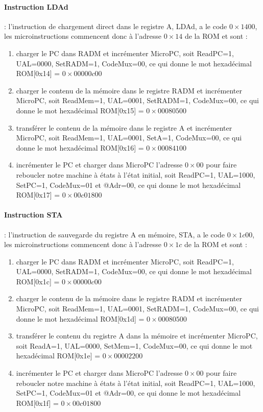 \paragraph{Instruction LDAd} : l'instruction de chargement direct dans le registre A, LDAd, a le code $0\times1400$, les microinstructions commencent donc à l'adresse $0\times14$ de la ROM et sont :
\begin{enumerate}
\item charger le PC dans RADM et incrémenter MicroPC, soit ReadPC=1, UAL=0000, SetRADM=1, CodeMux=00, ce qui donne le mot hexadécimal ROM[0x14] = $0\times00000c00$
\item charger le contenu de la mémoire dans le registre RADM et incrémenter MicroPC, soit ReadMem=1, UAL=0001, SetRADM=1, CodeMux=00, ce qui donne le mot hexadécimal ROM[0x15] = $0\times00080500$
\item transférer le contenu de la mémoire dans le registre A et incrémenter MicroPC, soit ReadMem=1, UAL=0001, SetA=1, CodeMux=00, ce qui donne le mot hexadécimal ROM[0x16] = $0\times00084100$
\item incrémenter le PC et charger dans MicroPC l'adresse $0\times00$ pour faire reboucler notre machine à états à l'état initial, soit ReadPC=1, UAL=1000, SetPC=1, CodeMux=01 et @Adr=00, ce qui donne le mot hexadécimal ROM[0x17] = $0\times00c01800$
\end{enumerate}

\paragraph{Instruction STA} : l'instruction de sauvegarde du registre A en mémoire, STA, a le code $0\times1c00$, les microinstructions commencent donc à l'adresse $0\times1c$ de la ROM et sont :
\begin{enumerate}
\item charger le PC dans RADM et incrémenter MicroPC, soit ReadPC=1, UAL=0000, SetRADM=1, CodeMux=00, ce qui donne le mot hexadécimal ROM[0x1c] = $0\times00000c00$
\item charger le contenu de la mémoire dans le registre RADM et incrémenter MicroPC, soit ReadMem=1, UAL=0001, SetRADM=1, CodeMux=00, ce qui donne le mot hexadécimal ROM[0x1d] = $0\times00080500$
\item transférer le contenu du registre A dans la mémoire et incrémenter MicroPC, soit ReadA=1, UAL=0000, SetMem=1, CodeMux=00, ce qui donne le mot hexadécimal ROM[0x1e] = $0\times00002200$
\item incrémenter le PC et charger dans MicroPC l'adresse $0\times00$ pour faire reboucler notre machine à états à l'état initial, soit ReadPC=1, UAL=1000, SetPC=1, CodeMux=01 et @Adr=00, ce qui donne le mot hexadécimal ROM[0x1f] = $0\times00c01800$
\end{enumerate}

